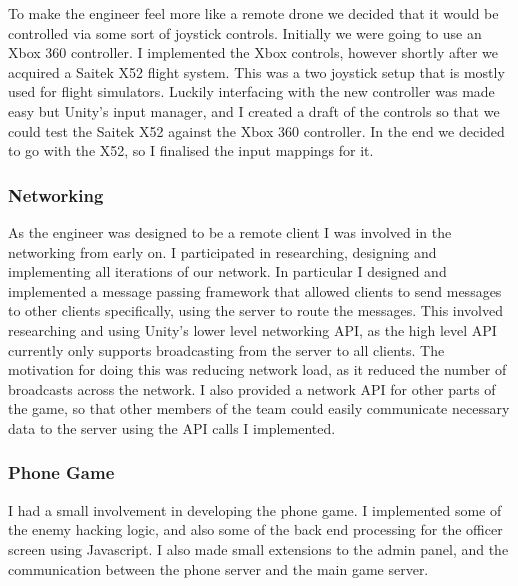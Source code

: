 \documentclass[a4paper,11pt]{article}
\begin{document}
To make the engineer feel more like a remote drone we decided that it would be controlled via some sort of joystick controls. Initially we were going to use an Xbox 360 controller. I implemented the Xbox controls, however shortly after we acquired a Saitek X52 flight system. This was a two joystick setup that is mostly used for flight simulators. Luckily interfacing with the new controller was made easy but Unity’s input manager, and I created a draft of the controls so that we could test the Saitek X52 against the Xbox 360 controller. In the end we decided to go with the X52, so I finalised the input mappings for it.

\subsubsection{Networking}

As the engineer was designed to be a remote client I was involved in the networking from early on. I participated in researching, designing and implementing all iterations of our network. In particular I designed and implemented a message passing framework that allowed clients to send messages to other clients specifically, using the server to route the messages. This involved researching and using Unity’s lower level networking API, as the high level API currently only supports broadcasting from the server to all clients. The motivation for doing this was reducing network load, as it reduced the number of broadcasts across the network. I also provided a network API for other parts of the game, so that other members of the team could easily communicate necessary data to the server using the API calls I implemented.

\subsubsection{Phone Game}

I had a small involvement in developing the phone game. I implemented some of the enemy hacking logic, and also some of the back end processing for the officer screen using Javascript. I also made small extensions to the admin panel, and the communication between the phone server and the main game server.

\clearpage
\end{document}
